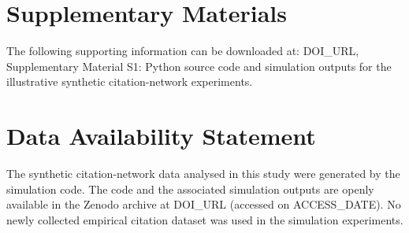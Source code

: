 
\section*{Supplementary Materials}
The following supporting information can be downloaded at: DOI_URL, Supplementary Material S1: Python source code and simulation outputs for the illustrative synthetic citation-network experiments.

\section*{Data Availability Statement}
The synthetic citation-network data analysed in this study were generated by the simulation code. The code and the associated simulation outputs are openly available in the Zenodo archive at DOI_URL (accessed on ACCESS_DATE). No newly collected empirical citation dataset was used in the simulation experiments.
